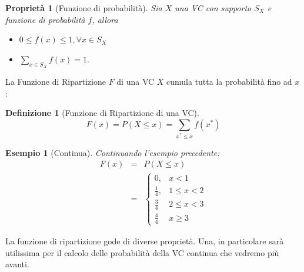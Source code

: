 \documentclass[
  11pt,
]{book}
\providecommand{\tightlist}{%
  \setlength{\itemsep}{0pt}\setlength{\parskip}{0pt}}
\theoremstyle{mytheoremstyle}
\newtheorem{proposition}{Proprietà}[section]
\theoremstyle{mydefstyle}
\newtheorem{definition}{Definizione}[section]
\newtheorem{example}{{Esempio}}[section]
\begin{document}
\begin{info}

\begin{proposition}[Funzione di probabilità]

Sia \(X\) una VC con supporto \(S_X\) e funzione di probabilità \(f\), allora

\begin{itemize}
\tightlist
\item
  \(0\le f(x)\le1,\forall x\in S_X\)
\item
  \(\sum_{x\in S_X} f(x) = 1.\)
\end{itemize}

\end{proposition}

\end{info}

La Funzione di Ripartizione \(F\) di una VC \(X\) cumula tutta la probabilità fino ad \(x\):

\begin{info}

\begin{definition}[Funzione di Ripartizione di una VC]
\[
F(x)=P(X\le x)=\sum_{x^*\le x} f(x^*)
\]
\end{definition}

\end{info}

\begin{example}[Continua]
Continuando l'esempio precedente:
\begin{eqnarray*}
F(x)&=&P(X\le x)\\
    &=&\begin{cases}
    0, &x<1\\
    \frac 1 4, &1\le x<2\\
    \frac 3 4 &2\le x< 3\\
    \frac 4 4 & x\ge 3
    \end{cases}
\end{eqnarray*}
\end{example}

La funzione di ripartizione gode di diverse proprietà. Una, in particolare sarà utilissima
per il calcolo delle probabilità della VC continua che vedremo più avanti.
\end{document}
